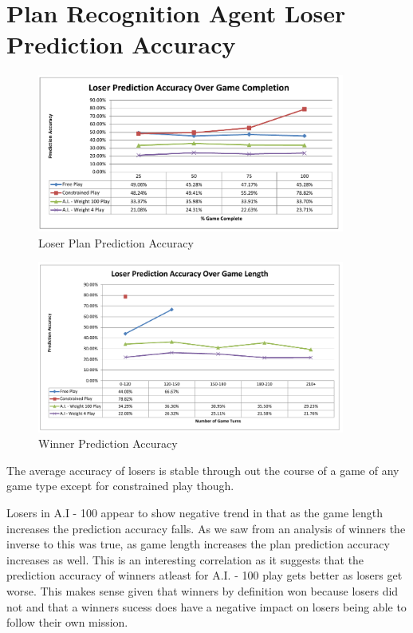 \documentclass[parskip]{cs4rep}
\begin{document}
\section{Plan Recognition Agent Loser Prediction Accuracy}

\begin{figure}[h]
\centerline{
\includegraphics[width=0.9\textwidth]{images/loser-game-complete.pdf}
}
\caption{Loser Plan Prediction Accuracy}
\label{fig:dom-debug-gui}
\end{figure} 

\begin{figure}[h]
\centerline{
\includegraphics[width=0.9\textwidth]{images/loser-game-length.pdf}
}
\caption{Winner Prediction Accuracy}
\label{fig:dom-debug-gui}
\end{figure}

The average accuracy of losers is stable through out the course of a game of any game type except for constrained play though.

Losers in A.I - 100 appear to show negative trend in that as the game length increases the prediction accuracy falls. As we saw from an analysis of winners the inverse to this was true, as game length increases the plan prediction accuracy increases as well. This is an interesting correlation as it suggests that the prediction accuracy of winners atleast for A.I. - 100 play gets better as losers get worse. This makes sense given that winners by definition won because losers did not and that a winners sucess does have a negative impact on losers being able to follow their own mission.
\end{document}
